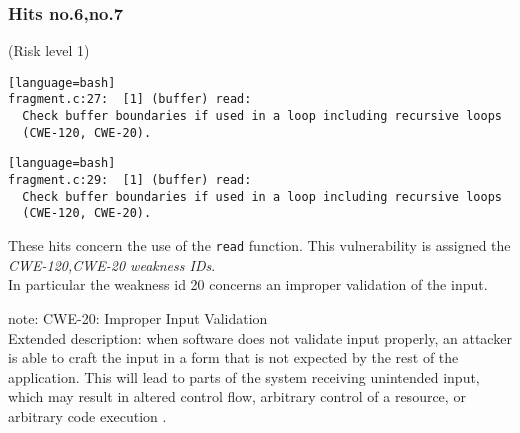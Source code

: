 \documentclass[a4paper,12pt]{article}
\newenvironment{SpecialPar}
  {\begin{shaded}}
  {\end{shaded}}
\begin{document}
\subsubsection{Hits no.6,no.7}
(Risk level 1)

\begin{lstlisting}[style=DOS][language=bash]
fragment.c:27:  [1] (buffer) read:
  Check buffer boundaries if used in a loop including recursive loops
  (CWE-120, CWE-20).
\end{lstlisting}

\begin{lstlisting}[style=DOS][language=bash]
fragment.c:29:  [1] (buffer) read:
  Check buffer boundaries if used in a loop including recursive loops
  (CWE-120, CWE-20).

\end{lstlisting}
These hits concern the use of the \texttt{read} function. This vulnerability is assigned the \textit{CWE-120,CWE-20 weakness IDs}.\\
In particular the weakness id 20 concerns an improper validation of the input\cite{CWE}.
\newpage
\begin{SpecialPar}
\noindent
note: CWE-20: Improper Input Validation\\
Extended description: when software does not validate input properly, an attacker is able to craft the input in a form that is not expected by the rest of the application. This will lead to parts of the system receiving unintended input, which may result in altered control flow, arbitrary control of a resource, or arbitrary code execution \cite{CWE20}.
\end{SpecialPar}
\end{document}
